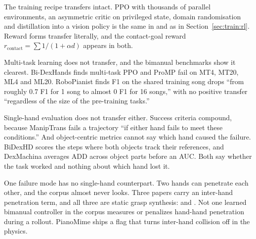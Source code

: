 \label{subsec:bimanual_transfer}
The training recipe transfers intact. PPO with thousands of parallel environments, an asymmetric
critic on privileged state, domain randomisation and distillation into a vision policy is the same
in \cite{twisting_lids_2024} and \cite{humanoid_sim2real_recipe_2025} as in
Section~\ref{sec:train:rl}. Reward forms transfer literally, and the contact-goal reward
$r_{\mathrm{contact}} = \sum 1/(1+\alpha d)$ appears in both.

Multi-task learning does not transfer, and the bimanual benchmarks show it clearest. Bi-DexHands
\cite{bidexhands_2022} finds multi-task PPO and ProMP fail on MT4, MT20, ML4 and ML20. RoboPianist
\cite{robopianist_2023} finds F1 on the shared training song drops ``from roughly 0.7 F1 for 1
song to almost 0 F1 for 16 songs,'' with no positive transfer ``regardless of the size of the
pre-training tasks.''

Single-hand evaluation does not transfer either. Success criteria compound, because ManipTrans
\cite{maniptrans_2025} fails a trajectory ``if either hand fails to meet these conditions.'' And
object-centric metrics cannot say which hand caused the failure. BiDexHD \cite{bidexhd_2024}
scores the steps where both objects track their references, and DexMachina \cite{dexmachina_2025}
averages ADD across object parts before an AUC. Both say whether the task worked and nothing about
which hand lost it.

One failure mode has no single-hand counterpart. Two hands can penetrate each other, and the
corpus almost never looks. Three papers carry an inter-hand penetration term, and all three are
static grasp synthesis: \cite{bimangrasp_2024,bidexgrasp_2026} and \cite{deximit_2026}. Not one
learned bimanual controller in the corpus measures or penalizes hand-hand penetration during a
rollout. PianoMime \cite{pianomime_2024} ships a flag that turns inter-hand collision off in the
physics.
